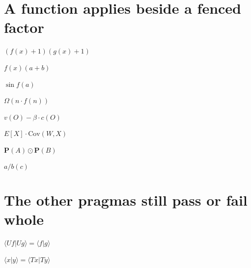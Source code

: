 \documentclass{article}
\begin{document}
\section{A function applies beside a fenced factor}
$(f(x)+1)(g(x)+1)$

$f(x)(a+b)$

$\sin f(a)$

$\Omega(n\cdot f(n))$

$v(O)-\beta\cdot c(O)$

$E[X]\cdot\mathrm{Cov}(W,X)$

$\mathbf{P}(A)\odot\mathbf{P}(B)$

$a/b(c)$

\section{The other pragmas still pass or fail whole}
$\langle Uf|Ug\rangle=\langle f|g\rangle$

$\langle x|y\rangle=\langle Tx|Ty\rangle$

\end{document}
